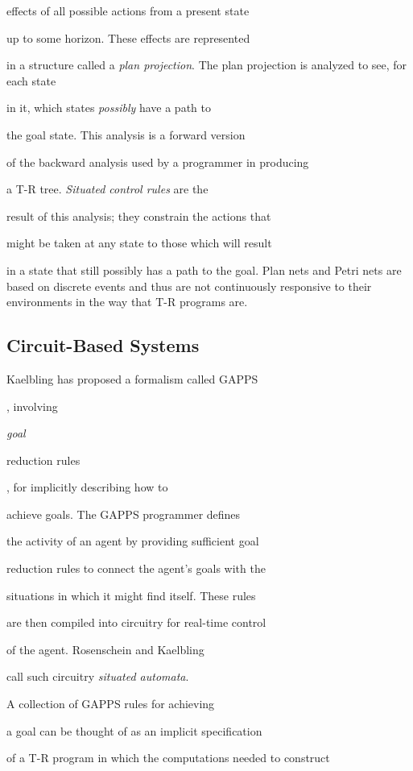 effects of all possible actions from a present state 

up to some horizon.  These effects are represented 

in a structure called a  {\it plan projection}. The plan projection is  
analyzed to see, for each state 

in it, which states {\it possibly}  have a path to 

the goal state.  This analysis is a forward version 

of the backward analysis used by a programmer in producing 

a T-R tree.  {\it Situated control rules}  are the 

result of this analysis; they constrain the actions that 

might be taken at any state to those which will result 

in a state that still possibly has a path to the goal.  Plan nets and Petri  
nets are based on discrete events and thus are not continuously responsive to  
their environments in the way that T-R programs are.

\subsection{Circuit-Based Systems}
 

Kaelbling has proposed a formalism called GAPPS 

\cite{Kaelbling1,Kaelbling},  involving {\it goal 

reduction rules}, for implicitly describing how to 

achieve goals.  The GAPPS  programmer defines 

the activity of an agent by providing sufficient goal 

reduction rules to connect the agent's goals with the 

situations in which it might find itself.  These rules 

are then compiled into circuitry for real-time control 

of the agent.  Rosenschein and Kaelbling \cite{Rosenschein} 

call such circuitry {\it situated automata}.  


A collection of GAPPS  rules for achieving 

a goal can be thought of as an implicit specification 

of a T-R program in which the computations needed to construct 

